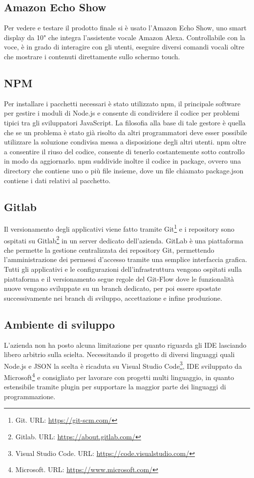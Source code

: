 \subsection{Amazon Echo Show}
Per vedere e testare il prodotto finale si è usato l'Amazon Echo Show, uno smart display da 10" che integra l’assistente vocale Amazon Alexa. Controllabile con la voce, è in grado di interagire con gli utenti, eseguire diversi comandi vocali oltre che mostrare i contenuti direttamente sullo schermo touch.

\subsection{NPM}
\label{npm}
Per installare i pacchetti necessari è stato utilizzato npm, il principale software per gestire i moduli di Node.js e consente di condividere il codice per problemi tipici tra gli sviluppatori JavaScript. La filosofia alla base di tale gestore è quella che se un problema è stato già risolto da altri programmatori deve esser possibile utilizzare la soluzione condivisa messa a disposizione degli altri utenti. npm oltre a consentire il riuso del codice, consente di tenerlo costantemente sotto controllo in modo da aggiornarlo. npm suddivide inoltre il codice in package, ovvero una directory che contiene uno o più file insieme, dove un file chiamato package.json contiene i dati relativi al pacchetto.

\subsection{Gitlab}
Il versionamento degli applicativi viene fatto tramite Git\footnote{Git. URL: \href{https://git-scm.com/}{https://git-scm.com/}} e i repository sono ospitati su Gitlab\footnote{Gitlab. URL: \href{https://about.gitlab.com/}{https://about.gitlab.com/}} in un server dedicato dell'azienda. GitLab è una piattaforma che permette la gestione centralizzata dei repository Git, permettendo l'amministrazione dei permessi d'accesso tramite una semplice interfaccia grafica. Tutti gli applicativi e le configurazioni dell'infrastruttura vengono ospitati sulla piattaforma e il versionamento segue regole del Git-Flow dove le funzionalità nuove vengono sviluppate su un branch dedicato, per poi essere spostate successivamente nei branch di sviluppo, accettazione e infine produzione.

\subsection{Ambiente di sviluppo}
L’azienda non ha posto alcuna limitazione per quanto riguarda gli IDE lasciando libero arbitrio sulla scielta. Necessitando il progetto di diversi linguaggi quali Node.js e JSON la scelta è ricaduta su Visual Studio Code\footnote{Visual Studio Code. URL: \href{https://code.visualstudio.com/}{https://code.visualstudio.com/}}, IDE sviluppato da Microsoft\footnote{Microsoft. URL: \href{https://www.microsoft.com/}{https://www.microsoft.com/}} e consigliato per lavorare con progetti multi linguaggio, in quanto estensibile tramite plugin per supportare la maggior parte dei linguaggi di programmazione.
